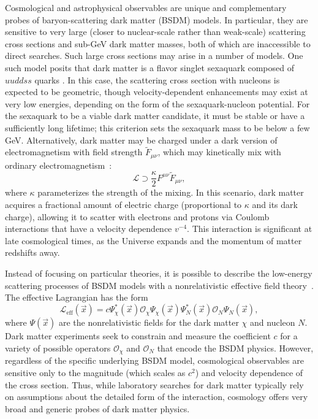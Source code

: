 Cosmological and astrophysical observables are unique and complementary probes of baryon-scattering dark matter (BSDM) models.
In particular, they are sensitive to very large (closer to nuclear-scale rather than weak-scale) scattering cross sections and sub-GeV dark matter masses, both of which are inaccessible to direct searches.
Such large cross sections may arise in a number of models.
One such model posits that dark matter is a flavor singlet sexaquark composed of $uuddss$ quarks \citep{Farrar:2017eqq}.
In this case, the scattering cross section with nucleons is expected to be geometric, though velocity-dependent enhancements may exist at very low energies, depending on the form of the sexaquark-nucleon potential.
For the sexaquark to be a viable dark matter candidate, it must be stable or have a sufficiently long lifetime; this criterion sets the sexaquark mass to be below a few GeV.
Alternatively, dark matter may be charged under a dark version of electromagnetism with field strength $\tilde{F}_{\mu\nu}$, which may kinetically mix with ordinary electromagnetism~\citep{Holdom:1985ag}:
\begin{equation}
    \mathcal{L} \supset \frac{\kappa}{2} F^{\mu\nu} \tilde{F}_{\mu\nu} ,
\end{equation}
where $\kappa$ parameterizes the strength of the mixing.
In this scenario, dark matter acquires a fractional amount of electric charge (proportional to $\kappa$ and its dark charge), allowing it to scatter with electrons and protons via Coulomb interactions that have a velocity dependence $v^{-4}$.
This interaction is significant at late cosmological times, as the Universe expands and the momentum of matter redshifts away.

Instead of focusing on particular theories, it is possible to describe the low-energy scattering processes of BSDM models with a nonrelativistic effective field theory~\citep{Fan:2010gt,Fitzpatrick:2012ix,Anand:2013yka}.
The effective Lagrangian has the form
\begin{equation}
    \mathcal{L}_\textrm{eff}(\vec{x})
    = c \Psi_\chi^\ast (\vec{x}) \mathcal{O}_\chi \Psi_\chi (\vec{x})
    \Psi_N^\ast (\vec{x}) \mathcal{O}_N \Psi_N (\vec{x}) ,
\end{equation}
where $\Psi (\vec{x})$ are the nonrelativistic fields for the dark matter $\chi$ and nucleon $N$.
Dark matter experiments seek to constrain and measure the coefficient $c$ for a variety of possible operators $\mathcal{O}_\chi$ and $\mathcal{O}_N$ that encode the BSDM physics.
However, regardless of the specific underlying BSDM model, cosmological observables are sensitive only to the magnitude (which scales as $c^2$) and velocity dependence of the cross section.
Thus, while laboratory searches for dark matter typically rely on assumptions about the detailed form of the interaction, cosmology offers very broad and generic probes of dark matter physics.

